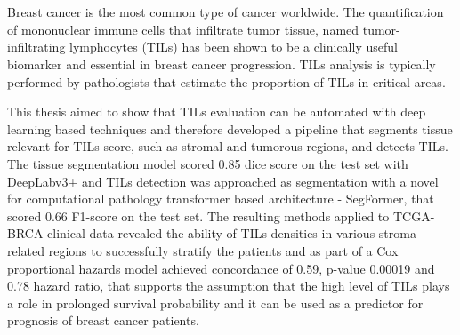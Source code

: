 \chapter{\abstractname}

Breast cancer is the most common type of cancer worldwide.
The quantification of mononuclear immune cells that infiltrate tumor tissue, named tumor-infiltrating lymphocytes (TILs) has been shown to
be a clinically useful biomarker and essential in breast cancer progression. TILs analysis is typically performed by pathologists that estimate the proportion of TILs in critical areas.

This thesis aimed to show that TILs evaluation can be automated with deep learning based techniques and therefore developed a pipeline that segments tissue relevant for TILs score, such as stromal and tumorous regions, and detects TILs. The tissue segmentation model scored 0.85 dice score on the test set with DeepLabv3+ and TILs detection was approached as segmentation with a novel for computational pathology transformer based architecture - SegFormer, that scored 0.66 F1-score on the test set. The resulting methods applied to TCGA-BRCA clinical data revealed the ability of TILs densities in various stroma related regions to successfully stratify the patients and as part of a Cox proportional hazards model achieved concordance of 0.59, p-value 0.00019 and 0.78 hazard ratio, that supports the assumption that the high level of TILs plays a role in prolonged survival probability and it can be used as a predictor for prognosis of breast cancer patients.



\makeatletter
{}
{\renewcommand{\abstractname}{Kurzfassung}}
{\renewcommand{\abstractname}{Abstract}}
\makeatother

\chapter{\abstractname}

